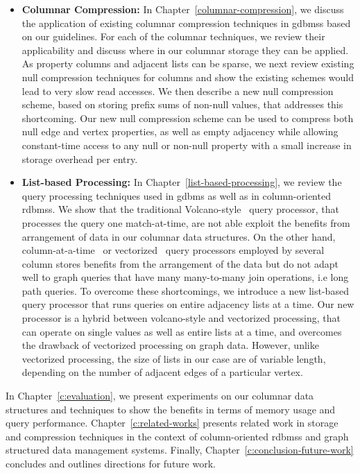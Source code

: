 \begin{itemize}
	\item \textbf{Columnar Compression:} In Chapter~\ref{columnar-compression}, we discuss the application of existing columnar compression techniques in \gls{gdbms}s based on our guidelines. For each of the columnar techniques, we review their applicability and discuss where in our columnar storage they can be applied. As property columns and adjacent lists can be sparse, we next review existing null compression techniques for columns and show the existing schemes would lead to very slow read accesses. We then describe a new null compression scheme, based on storing prefix sums of non-null values, that addresses this shortcoming. Our new null compression scheme can be used to compress both null edge and vertex properties, as well as empty adjacency while allowing constant-time access to any null or non-null property with a small increase in storage overhead per entry. 
	
	\item \textbf{List-based Processing:} In Chapter~\ref{list-based-processing}, we review the query processing techniques used in \gls{gdbms} as well as in column-oriented \gls{rdbms}s. We show that the traditional  Volcano-style~\cite{volcano} query processor, that processes the query one match-at-time, are not able exploit the benefits from arrangement of data in our columnar data structures. On the other hand, column-at-a-time~\cite{col-vs-row} or vectorized~\cite{boncz-vectorwise1} query processors employed by several column stores benefits from the arrangement of the data but do not adapt well to graph queries that have many many-to-many join operations, i.e long path queries. To overcome these shortcomings, we introduce a new list-based query processor that runs queries on entire adjacency lists at a time. Our new processor is a hybrid between volcano-style and vectorized processing, that can operate on single values as well as entire lists at a time, and overcomes the drawback of vectorized processing on graph data. However, unlike vectorized processing, the size of lists in our case are of variable length, depending on the number of adjacent edges of a particular vertex.
\end{itemize}

In Chapter~\ref{c:evaluation}, we present experiments on our columnar data structures and techniques to show the benefits in terms of memory usage and query performance. Chapter~\ref{c:related-works} presents related work in storage and compression techniques in the context of column-oriented \gls{rdbms}s and graph structured data management systems. Finally, Chapter~\ref{c:conclusion-future-work} concludes and outlines directions for future work.


